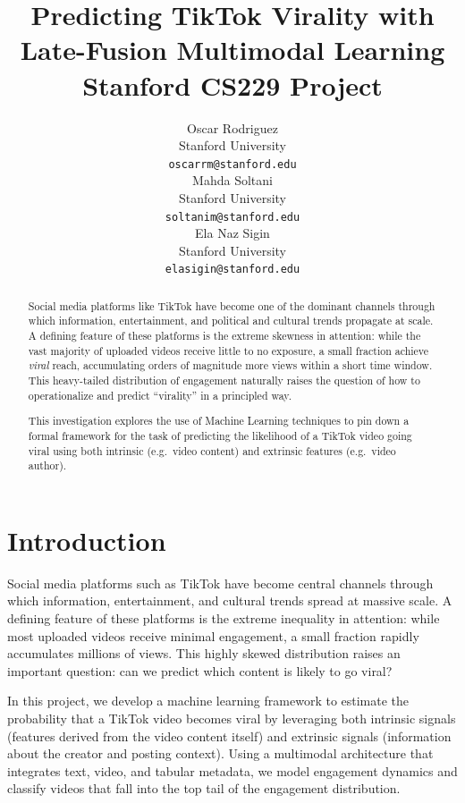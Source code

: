 \documentclass{article}
\title{
  Predicting TikTok Virality with Late-Fusion Multimodal Learning \\
  \vspace{1em}
  \small{\normalfont Stanford CS229 Project}
}
\author{
  Oscar Rodriguez \\
  Stanford University \\
  \texttt{oscarrm@stanford.edu} \\
  \And
  Mahda Soltani \\
  Stanford University \\
  \texttt{soltanim@stanford.edu} \\
  \And
  Ela Naz Sigin \\
  Stanford University \\
  \texttt{elasigin@stanford.edu}
}
\begin{document}
\maketitle
\vspace{-19pt}

\begin{abstract}
\vspace{-10pt}
Social media platforms like TikTok have become one of the dominant channels
through which information, entertainment, and political and cultural trends
propagate at scale. A defining feature of these platforms is the extreme
skewness in attention: while the vast majority of uploaded videos receive little
to no exposure, a small fraction achieve \textit{viral} reach, accumulating
orders of magnitude more views within a short time window. This heavy-tailed
distribution of engagement naturally raises the question of how to
operationalize and predict ``virality'' in a principled way.

This investigation explores the use of Machine Learning techniques to pin down a
formal framework for the task of predicting the likelihood of a TikTok video
going viral using both intrinsic (e.g.\ video content) and extrinsic features
(e.g.\ video author).
\end{abstract}
\vspace{-11pt}
\section{Introduction}
\label{sec:intro}
Social media platforms such as TikTok have become central channels through which information, entertainment, and cultural trends spread at massive scale. A defining feature of these platforms is the extreme inequality in attention: while most uploaded videos receive minimal engagement, a small fraction rapidly accumulates millions of views. This highly skewed distribution raises an important question: can we predict which content is likely to go viral?

In this project, we develop a machine learning framework to estimate the probability that a TikTok video becomes viral by leveraging both intrinsic signals (features derived from the video content itself) and extrinsic signals (information about the creator and posting context). Using a multimodal architecture that integrates text, video, and tabular metadata, we model engagement dynamics and classify videos that fall into the top tail of the engagement distribution.
\end{document}
